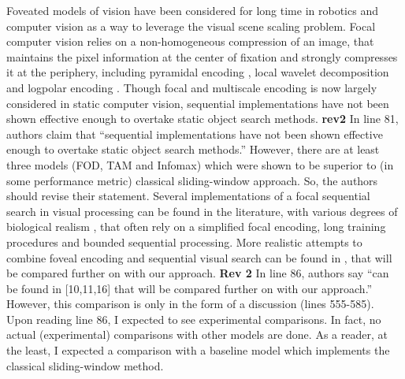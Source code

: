 Foveated models of vision have been considered for long time in robotics and computer vision as a way to leverage the visual scene scaling problem. Focal computer vision relies on a non-homogeneous compression of an image, that maintains the pixel information at the center of fixation and strongly compresses it at the periphery, including pyramidal encoding \cite{kortum1996implementation,Butko2010infomax}, local wavelet decomposition \cite{dauce2018active} and logpolar encoding \cite{fischer2007self,Traver10}. Though focal and multiscale encoding is now largely considered in static computer vision, sequential implementations have not been shown effective enough to overtake static object search methods. 
{\color{red} \textbf{rev2} In line 81, authors claim that “sequential implementations have not been shown effective enough to overtake static object search methods.” However, there are at least three models (FOD, TAM and Infomax) which were shown to be superior to (in some performance metric) classical sliding-window approach. So, the authors should revise their statement. 
}
Several implementations of a focal sequential search in visual processing can be found in the literature, with various degrees of biological realism \cite{mnih2014recurrent,fu2017look}, that often rely on a simplified focal encoding, long training procedures and bounded sequential processing. More realistic attempts to combine foveal encoding and sequential visual search can be {\color{red} found in \cite{Butko2010infomax,denil2012learning,dauce2018active}}, that will be compared further on with our approach.
{\color{red} \textbf{Rev 2}
In line 86, authors say “can be found in [10,11,16] that will be compared further on with our approach.” However, this comparison is only in the form of a discussion (lines 555-585). Upon reading line 86, I expected to see experimental comparisons. In fact, no actual (experimental) comparisons with other models are done. As a reader, at the least, I expected a comparison with a baseline model which implements the classical sliding-window method. 
}


